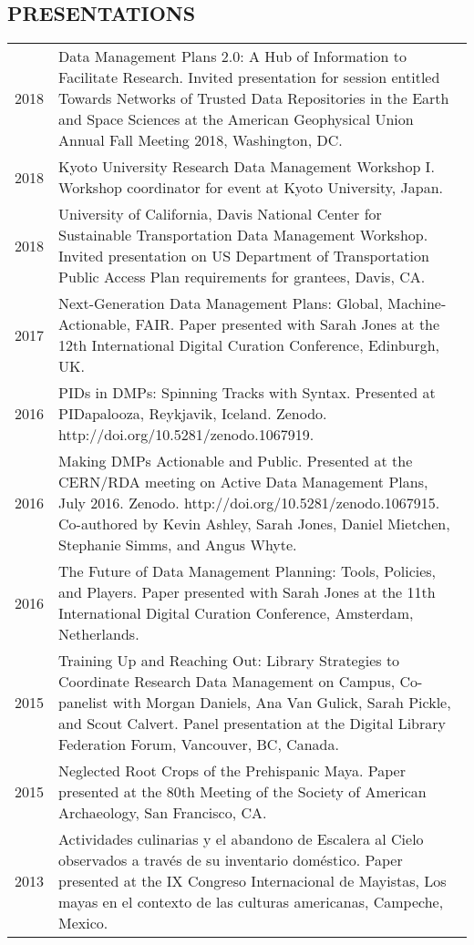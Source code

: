 \documentclass[10pt,centered]{res} %
\begin{document}
\begin{resume}
\section{\color{ResumeBlue}PRESENTATIONS}
\begin{tabular}{p{.5in}p{5.25in}<{\raggedright\arraybackslash}}
2018 & Data Management Plans 2.0: A Hub of Information to Facilitate Research. Invited presentation for session entitled Towards Networks of Trusted Data Repositories in the Earth and Space Sciences at the American Geophysical Union Annual Fall Meeting 2018, Washington, DC. \\
2018 & Kyoto University Research Data Management Workshop I. Workshop coordinator for event at Kyoto University, Japan. \\
2018 & University of California, Davis National Center for Sustainable Transportation Data Management Workshop. Invited presentation on US Department of Transportation Public Access Plan requirements for grantees, Davis, CA.\\
2017 & Next-Generation Data Management Plans: Global, Machine-Actionable, FAIR. Paper presented with Sarah Jones at the 12th International Digital Curation Conference, Edinburgh, UK.\\
2016 & PIDs in DMPs: Spinning Tracks with Syntax. Presented at PIDapalooza, Reykjavik, Iceland. Zenodo. http://doi.org/10.5281/zenodo.1067919.\\
2016 & Making DMPs Actionable and Public. Presented at the CERN/RDA meeting on Active Data Management Plans, July 2016. Zenodo. http://doi.org/10.5281/zenodo.1067915. Co-authored by Kevin Ashley, Sarah Jones, Daniel Mietchen, Stephanie Simms, and Angus Whyte. \\
2016 & The Future of Data Management Planning: Tools, Policies, and Players. Paper presented with Sarah Jones at the 11th International Digital Curation Conference, Amsterdam, Netherlands. \\
2015 & Training Up and Reaching Out: Library Strategies to Coordinate Research Data Management on Campus, Co-panelist with Morgan Daniels, Ana Van Gulick, Sarah Pickle, and Scout Calvert. Panel presentation at the Digital Library Federation Forum, Vancouver, BC, Canada.\\
2015 & Neglected Root Crops of the Prehispanic Maya. Paper presented at the 80th Meeting of the Society of American Archaeology, San Francisco, CA.\\
2013 & Actividades culinarias y el abandono de Escalera al Cielo observados a trav\'{e}s de su inventario dom\'{e}stico. Paper presented at the IX Congreso Internacional de Mayistas, Los mayas en el contexto de las culturas americanas, Campeche, Mexico.\\

\end{tabular}
\end{resume}
\end{document}
